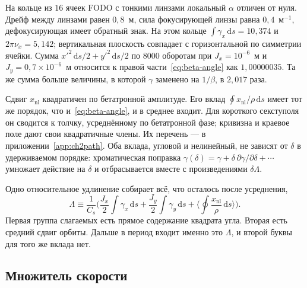 На кольце из $16$ ячеек FODO с тонкими линзами локальный $\alpha$ отличен от нуля. Дрейф между линзами равен $0{,}8$~м, сила фокусирующей линзы равна $0{,}4$~м$^{-1}$, дефокусирующая имеет обратный знак. На этом кольце $\int\gamma_x\,\mathrm{d}s=10{,}374$ и $2\pi\nu_x=5{,}142$; вертикальная плоскость совпадает с горизонтальной по симметрии ячейки. Сумма $x'^2\,\mathrm{d}s/2+y'^2\,\mathrm{d}s/2$ по $8000$ оборотам при $J_x=10^{-6}$~м и $J_y=0{,}7\times 10^{-6}$~м относится к правой части~\eqref{eq:beta-angle} как $1{,}00000035$. Та же сумма больше величины, в которой $\gamma$ заменено на $1/\beta$, в $2{,}017$ раза.

Сдвиг $x_{\mathrm{nl}}$ квадратичен по бетатронной амплитуде. Его вклад $\oint x_{\mathrm{nl}}/\rho\,\mathrm{d}s$ имеет тот же порядок, что и~\eqref{eq:beta-angle}, и в среднее входит. Для короткого секступоля он сводится к толчку, усреднённому по бетатронной фазе; кривизна и краевое поле дают свои квадратичные члены. Их перечень --- в приложении~\ref{app:ch2path}. Оба вклада, угловой и нелинейный, не зависят от $\delta$ в удерживаемом порядке: хроматическая поправка $\gamma(\delta)=\gamma+\delta\,\partial\gamma/\partial\delta+\cdots$ умножает действие на $\delta$ и отбрасывается вместе с произведениями $\delta\Lambda$.

Одно относительное удлинение собирает всё, что осталось после усреднения,
\begin{equation}
\label{eq:beta-Lambda}
\Lambda
\equiv
\frac{1}{C_s}
\Biggl(
\frac{J_x}{2}\int\gamma_x\,\mathrm{d}s
+\frac{J_y}{2}\int\gamma_y\,\mathrm{d}s
+\Biggl\langle\oint\frac{x_{\mathrm{nl}}}{\rho}\,\mathrm{d}s\Biggr\rangle
\Biggr).
\end{equation}
Первая группа слагаемых есть прямое содержание квадрата угла. Вторая есть средний сдвиг орбиты. Дальше в период входит именно это $\Lambda$, и второй буквы для того же вклада нет.

\subsection{Множитель скорости}
\label{sec:ch2-speed}

